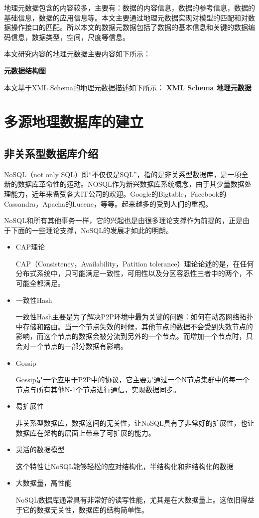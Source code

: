 \documentclass[master]{njnuthesis}
\begin{document}
地理元数据包含的内容较多，主要有：数据的内容信息，数据的参考信息，数据的基础信息，数据的应用信息等。本文主要通过地理元数据实现对模型的匹配和对数据操作接口的匹配。所以本文的数据元数据包括了数据的基本信息和关键的数据编码信息，数据类型，空间，尺度等信息。

本文研究内容的地理元数据主要内容如下所示：

\textbf{元数据结构图}

本文基于XML Schema的地理元数据描述如下所示：
\textbf{XML Schema 地理元数据}



\section{多源地理数据库的建立}
\subsection{非关系型数据库介绍}
NoSQL（not only SQL）即“不仅仅是SQL”，指的是非关系型数据库，是一项全新的数据库革命性的运动。NOSQL作为新兴数据库系统概念，由于其少量数据处理能力，近年来备受各大IT公司的欢迎。Google的Bigtable，Facebook的Cassandra，Apacha的Lucene，等等。起来越多的受到人们的重视。

	NoSQL和所有其他事务一样，它的兴起也是由很多理论支撑作为前提的，正是由于下面的一些理论支撑，NoSQL的发展才如此的明朗。
\begin{itemize}
\item{CAP理论}

CAP（Consistency，Availability，Patition tolerance）理论论述的是，在任何分布式系统中，只可能满足一致性，可用性以及分区容忍性三者中的两个，不可能全都满足。
\item 一致性Hash

一致性Hash主要是为了解决P2P环境中最为关键的问题：如何在动态网络拓扑中存储和路由。当一个节点失效的时候，其他节点的数据不会受到失效节点的影响，而这个节点的数据会被分流到另外的一个节点。而增加一个节点时，只会对一个节点的一部分数据有影响。
\item Gossip

Gossip是一个应用于P2P中的协议，它主要是通过一个N节点集群中的每一个节点与所有其他N-1个节点进行通信，实现数据同步。

\item 易扩展性

非关系型数据库，数据这间的无关性，让NoSQL具有了非常好的扩展性，也让数据库在架构的层面上带来了可扩展的能力。
\item 灵活的数据模型

这个特性让NoSQL能够轻松的应对结构化，半结构化和非结构化的数据
\item 大数据量，高性能

NoSQL数据库通常具有非常好的读写性能，尤其是在大数据量上。这依旧得益于它的数据无关性，数据库的结构简单性。
\end{itemize}
\end{document}
